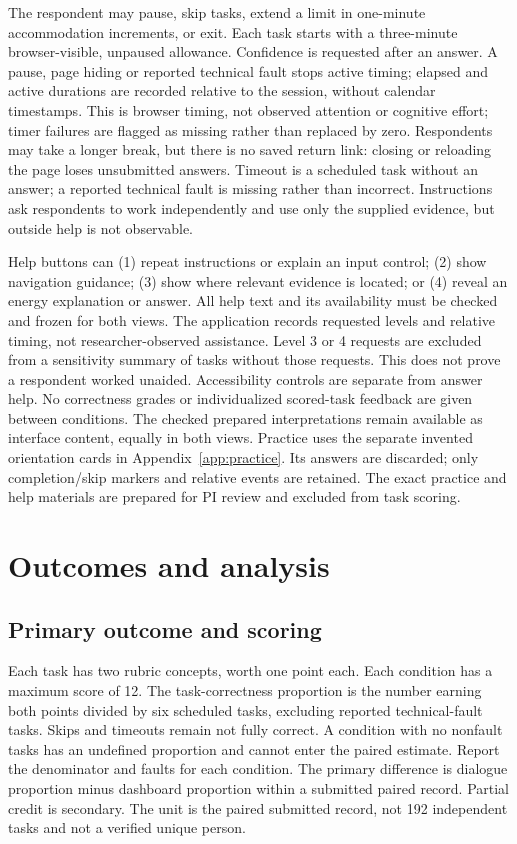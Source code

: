 \documentclass[11pt,letterpaper]{article}
\begin{document}
The respondent may pause, skip tasks, extend a limit in one-minute accommodation increments, or exit. Each task starts with a three-minute browser-visible, unpaused allowance. Confidence is requested after an answer. A pause, page hiding or reported technical fault stops active timing; elapsed and active durations are recorded relative to the session, without calendar timestamps. This is browser timing, not observed attention or cognitive effort; timer failures are flagged as missing rather than replaced by zero. Respondents may take a longer break, but there is no saved return link: closing or reloading the page loses unsubmitted answers. Timeout is a scheduled task without an answer; a reported technical fault is missing rather than incorrect. Instructions ask respondents to work independently and use only the supplied evidence, but outside help is not observable.

Help buttons can (1) repeat instructions or explain an input control; (2) show navigation guidance; (3) show where relevant evidence is located; or (4) reveal an energy explanation or answer. All help text and its availability must be checked and frozen for both views. The application records requested levels and relative timing, not researcher-observed assistance. Level 3 or 4 requests are excluded from a sensitivity summary of tasks without those requests. This does not prove a respondent worked unaided. Accessibility controls are separate from answer help. No correctness grades or individualized scored-task feedback are given between conditions. The checked prepared interpretations remain available as interface content, equally in both views. Practice uses the separate invented orientation cards in Appendix~\ref{app:practice}. Its answers are discarded; only completion/skip markers and relative events are retained. The exact practice and help materials are prepared for PI review and excluded from task scoring.

\section{Outcomes and analysis}
\subsection{Primary outcome and scoring}
Each task has two rubric concepts, worth one point each. Each condition has a maximum score of 12. The task-correctness proportion is the number earning both points divided by six scheduled tasks, excluding reported technical-fault tasks. Skips and timeouts remain not fully correct. A condition with no nonfault tasks has an undefined proportion and cannot enter the paired estimate. Report the denominator and faults for each condition. The primary difference is dialogue proportion minus dashboard proportion within a submitted paired record. Partial credit is secondary. The unit is the paired submitted record, not 192 independent tasks and not a verified unique person.
\end{document}
